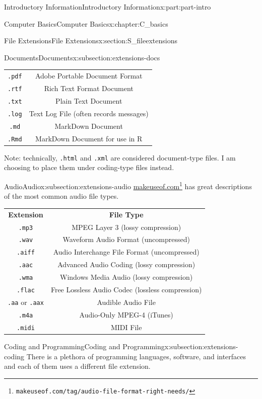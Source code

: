 \documentclass[oneside,10pt,]{book}
\newcommand{\tabularfont}{\relax}
\newcommand{\mono}[1]{\texttt{#1}}
\begin{document}
\begin{partptx}{Introductory Information}{}{Introductory Information}{}{}{x:part:part-intro}
\begin{chapterptx}{Computer Basics}{}{Computer Basics}{}{}{x:chapter:C_basics}
\begin{sectionptx}{File Extensions}{}{File Extensions}{}{}{x:section:S_fileextensions}
\begin{subsectionptx}{Documents}{}{Documents}{}{}{x:subsection:extensions-docs}
\begin{center}
{\begin{tabular}{cc}
\mono{.pdf}&Adobe Portable Document Format\tabularnewline[0pt]
\mono{.rtf}&Rich Text Format Document\tabularnewline[0pt]
\mono{.txt}&Plain Text Document\tabularnewline[0pt]
\mono{.log}&Text Log File (often records messages)\tabularnewline[0pt]
\mono{.md}&MarkDown Document\tabularnewline[0pt]
\mono{.Rmd}&MarkDown Document for use in R
\end{tabular}
}%
\end{center}%
Note: technically, \mono{.html} and \mono{.xml} are considered document-type files. I am choosing to place them under coding-type files instead.%
\end{subsectionptx}
%
%
\typeout{************************************************}
\typeout{************************************************}
%
\begin{subsectionptx}{Audio}{}{Audio}{}{}{x:subsection:extensions-audio}
%
\href{https://www.makeuseof.com/tag/audio-file-format-right-needs/}{makeuseof.com}\footnote{\nolinkurl{makeuseof.com/tag/audio-file-format-right-needs/}\label{g:fn:idm480867400}} has great descriptions of the most common audio file types.%
\begin{center}%
{\tabularfont%
\begin{tabular}{cc}
\textbf{Extension}&\textbf{File Type}\tabularnewline[0pt]
\mono{.mp3}&MPEG Layer 3 (lossy compression)\tabularnewline[0pt]
\mono{.wav}&Waveform Audio Format (uncompressed)\tabularnewline[0pt]
\mono{.aiff}&Audio Interchange File Format (uncompressed)\tabularnewline[0pt]
\mono{.aac}&Advanced Audio Coding (lossy compression)\tabularnewline[0pt]
\mono{.wma}&Windows Media Audio (lossy compression)\tabularnewline[0pt]
\mono{.flac}&Free Lossless Audio Codec (lossless compression)\tabularnewline[0pt]
\mono{.aa} or \mono{.aax}&Audible Audio File\tabularnewline[0pt]
\mono{.m4a}&Audio-Only MPEG-4 (iTunes)\tabularnewline[0pt]
\mono{.midi}&MIDI File
\end{tabular}
}%
\end{center}%
\end{subsectionptx}
%
%
\typeout{************************************************}
\typeout{************************************************}
%
\begin{subsectionptx}{Coding and Programming}{}{Coding and Programming}{}{}{x:subsection:extensions-coding}
%
There is a plethora of programming languages, software, and interfaces and each of them uses a different file extension.%

\end{subsectionptx}
\end{sectionptx}
\end{chapterptx}
\end{partptx}
\end{document}
